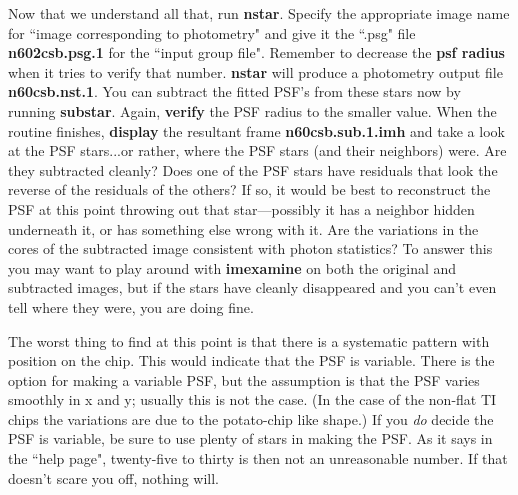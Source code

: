 Now that we understand all that, run {\bf nstar}.  Specify the appropriate
image name for ``image corresponding to photometry" and  give it
the ``.psg" file {\bf n602csb.psg.1} for the ``input group file".
Remember to decrease
the {\bf psf radius} when it tries to verify that number.  {\bf nstar}
will produce a photometry output file {\bf n60csb.nst.1}.
You can
subtract the fitted PSF's from these stars now by running {\bf substar}.
Again, {\bf verify} the PSF radius to the smaller value.  When the routine
finishes, {\bf display} the resultant frame {\bf n60csb.sub.1.imh} and
take a look at the PSF stars...or rather, where the PSF stars (and their
neighbors) were.  Are they subtracted cleanly?  Does one of the PSF
stars have residuals that look the reverse of the residuals of the others?
If so, it would be best to reconstruct the PSF at this point throwing out
that star---possibly it has a neighbor hidden underneath it, or has something
else wrong with it.  Are the variations in the cores of the subtracted image
consistent with photon statistics?  To answer this you may want to play
around with {\bf imexamine} on both the original and subtracted images,
but if the stars have cleanly disappeared and you can't even tell where
they were, you are doing fine. 
 
The worst thing to find at this point
is that there is a systematic pattern with position on the chip.  This
would indicate that the PSF is variable.  There is the option for making
a variable PSF, but the assumption is that the PSF varies smoothly in x
and
y; usually this is not the case.  (In the case of the non-flat TI chips
the variations are due to the potato-chip like shape.)  If you {\it do}
decide the PSF is variable, be sure to use plenty of stars in making the
PSF.  As it says in the ``help page",
twenty-five to thirty is then not an unreasonable number.  If that
doesn't scare you off, nothing will.
 
